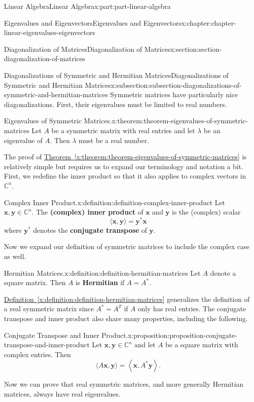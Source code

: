 \documentclass[twoside,10pt,]{book}
\newcommand{\xreffont}{\relax}
\newcommand{\terminology}[1]{\textbf{#1}}
\numberwithin{equation}{part}
\newcommand{\CC}{\mathbb{C}}
\newcommand{\xx}{\mathbf{x}}
\newcommand{\yy}{\mathbf{y}}
\newcommand{\dotprod}[1]{\left\langle #1 \right\rangle}
\begin{document}
\begin{partptx}{Linear Algebra}{}{Linear Algebra}{}{}{x:part:part-linear-algebra}
\begin{chapterptx}{Eigenvalues and Eigenvectors}{}{Eigenvalues and Eigenvectors}{}{}{x:chapter:chapter-linear-eigenvalues-eigenvectors}
\begin{sectionptx}{Diagonalization of Matrices}{}{Diagonalization of Matrices}{}{}{x:section:section-diagonalization-of-matrices}
\begin{subsectionptx}{Diagonalizations of Symmetric and Hermitian Matrices}{}{Diagonalizations of Symmetric and Hermitian Matrices}{}{}{x:subsection:subsection-diagonalizations-of-symmetric-and-hermitian-matrices}
Symmetric matrices have particularly nice diagonalizations. First, their eigenvalues must be limited to real numbers.%
\begin{theorem}{Eigenvalues of Symmetric Matrices.}{}{x:theorem:theorem-eigenvalues-of-symmetric-matrices}%
Let \(A\) be a symmetric matrix with real entries and let \(\lambda\) be an eigenvalue of \(A\). Then \(\lambda\) must be a real number.%
\end{theorem}
The proof of \hyperref[x:theorem:theorem-eigenvalues-of-symmetric-matrices]{Theorem~{\xreffont\ref{x:theorem:theorem-eigenvalues-of-symmetric-matrices}}} is relatively simple but requires us to expand our terminology and notation a bit. First, we redefine the inner product so that it also applies to complex vectors in \(\CC^n\).%
\begin{definition}{Complex Inner Product.}{x:definition:definition-complex-inner-product}%
Let \(\xx,\yy\in\CC^n\). The \terminology{(complex) inner product} of \(\xx\) and \(\yy\) is the (complex) scalar%
\begin{equation*}
\langle\xx,\yy\rangle = \yy^{*}\xx
\end{equation*}
where \(\yy^*\) denotes the \terminology{conjugate transpose} of \(\yy\).%
\end{definition}
Now we expand our definition of symmetric matrices to include the complex case as well.%
\begin{definition}{Hermitian Matrices.}{x:definition:definition-hermitian-matrices}%
Let \(A\) denote a square matrix. Then \(A\) is \terminology{Hermitian} if \(A = A^{*}\).%
\end{definition}
\hyperref[x:definition:definition-hermitian-matrices]{Definition~{\xreffont\ref{x:definition:definition-hermitian-matrices}}} generalizes the definition of a real symmetric matrix since \(A^* = A^T\) if \(A\) only has real entries. The conjugate transpose and inner product also share many properties, including the following.%
\begin{proposition}{Conjugate Transpose and Inner Product.}{}{x:proposition:proposition-conjugate-transpose-and-inner-product}%
Let \(\xx,\yy\in\CC^n\) and let \(A\) be a square matrix with complex entries. Then%
\begin{equation*}
\langle A\xx,\yy\rangle = \dotprod{\xx,A^*\yy}\text{.}
\end{equation*}
%
\end{proposition}
Now we can prove that real symmetric matrices, and more generally Hermitian matrices, always have real eigenvalues.%

\end{subsectionptx}
\end{sectionptx}
\end{chapterptx}
\end{partptx}
\end{document}
